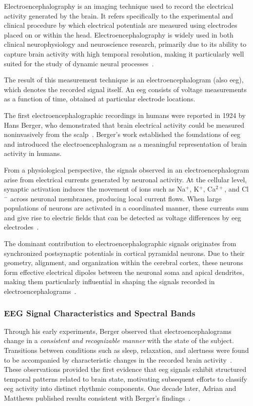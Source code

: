 Electroencephalography is an imaging technique used to record the electrical activity generated by the brain. It refers specifically to the experimental and clinical procedure by which electrical potentials are measured using electrodes placed on or within the head. Electroencephalography is widely used in both clinical neurophysiology and neuroscience research, primarily due to its ability to capture brain activity with high temporal resolution, making it particularly well suited for the study of dynamic neural processes~\cite{st-louis-2016}.

The result of this measurement technique is an electroencephalogram (also \gls{eeg}), which denotes the recorded signal itself. An \gls{eeg} consists of voltage measurements as a function of time, obtained at particular electrode locations. 

The first electroencephalographic recordings in humans were reported in 1924 by Hans Berger, who demonstrated that brain electrical activity could be measured noninvasively from the scalp~\cite{st-louis-2016}. Berger’s work established the foundations of \gls{eeg} and introduced the electroencephalogram as a meaningful representation of brain activity in humans.

From a physiological perspective, the signals observed in an electroencephalogram arise from electrical currents generated by neuronal activity. At the cellular level, synaptic activation induces the movement of ions such as Na$^+$, K$^+$, Ca$^{2+}$, and Cl$^-$ across neuronal membranes, producing local current flows. When large populations of neurons are activated in a coordinated manner, these currents sum and give rise to electric fields that can be detected as voltage differences by \gls{eeg} electrodes~\cite{abhang-2016,cherian-2024}.

The dominant contribution to electroencephalographic signals originates from synchronized postsynaptic potentials in cortical pyramidal neurons. Due to their geometry, alignment, and organization within the cerebral cortex, these neurons form effective electrical dipoles between the neuronal soma and apical dendrites, making them particularly influential in shaping the signals recorded in electroencephalograms~\cite{abhang-2016}.

\subsubsection{EEG Signal Characteristics and Spectral Bands}
Through his early experiments, Berger observed that electroencephalograms change in a \textit{consistent and recognizable manner} with the state of the subject. Transitions between conditions such as sleep, relaxation, and alertness were found to be accompanied by characteristic changes in the recorded brain activity~\cite{st-louis-2016,abhang-2016}. These observations provided the first evidence that \gls{eeg} signals exhibit structured temporal patterns related to brain state, motivating subsequent efforts to classify \gls{eeg} activity into distinct rhythmic components. One decade later, Adrian and Matthews published results consistent with Berger’s findings~\cite{abhang-2016}.

